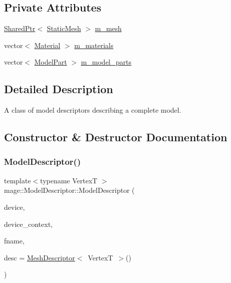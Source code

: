 \subsection*{Private Attributes}
\begin{DoxyCompactItemize}
\item 
\hyperlink{namespacemage_a1e01ae66713838a7a67d30e44c67703e}{Shared\+Ptr}$<$ \hyperlink{classmage_1_1_static_mesh}{Static\+Mesh} $>$ \hyperlink{classmage_1_1_model_descriptor_ac3935d5b0738860809a770403ed07480}{m\+\_\+mesh}
\item 
vector$<$ \hyperlink{structmage_1_1_material}{Material} $>$ \hyperlink{classmage_1_1_model_descriptor_a672238b257f99836243d84f634ffeea2}{m\+\_\+materials}
\item 
vector$<$ \hyperlink{structmage_1_1_model_part}{Model\+Part} $>$ \hyperlink{classmage_1_1_model_descriptor_a200c6e44c9b6a5bde5c8490fb93ba00f}{m\+\_\+model\+\_\+parts}
\end{DoxyCompactItemize}


\subsection{Detailed Description}
A class of model descriptors describing a complete model. 

\subsection{Constructor \& Destructor Documentation}
\hypertarget{classmage_1_1_model_descriptor_a1ae1d85907be96350cef77e6a4ba4fb9}{}\label{classmage_1_1_model_descriptor_a1ae1d85907be96350cef77e6a4ba4fb9} 
\subsubsection{\texorpdfstring{Model\+Descriptor()}{ModelDescriptor()}\hspace{0.1cm}{\footnotesize\ttfamily [1/3]}}
{\footnotesize\ttfamily template$<$typename VertexT $>$ \\
mage\+::\+Model\+Descriptor\+::\+Model\+Descriptor (\begin{DoxyParamCaption}\item[{I\+D3\+D11\+Device2 $\ast$}]{device,  }\item[{I\+D3\+D11\+Device\+Context2 $\ast$}]{device\+\_\+context,  }\item[{const wstring \&}]{fname,  }\item[{const \hyperlink{structmage_1_1_mesh_descriptor}{Mesh\+Descriptor}$<$ VertexT $>$ \&}]{desc = {\ttfamily \hyperlink{structmage_1_1_mesh_descriptor}{Mesh\+Descriptor}$<$~VertexT~$>$()} }\end{DoxyParamCaption})\hspace{0.3cm}{\ttfamily [explicit]}}

